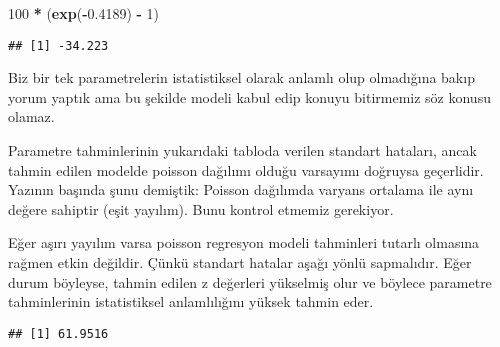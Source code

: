 \documentclass[
]{book}
\newenvironment{Shaded}{\begin{snugshade}}{\end{snugshade}}
\newcommand{\DataTypeTok}[1]{\textcolor[rgb]{0.13,0.29,0.53}{#1}}
\newcommand{\DecValTok}[1]{\textcolor[rgb]{0.00,0.00,0.81}{#1}}
\newcommand{\FloatTok}[1]{\textcolor[rgb]{0.00,0.00,0.81}{#1}}
\newcommand{\KeywordTok}[1]{\textcolor[rgb]{0.13,0.29,0.53}{\textbf{#1}}}
\newcommand{\NormalTok}[1]{#1}
\newcommand{\OperatorTok}[1]{\textcolor[rgb]{0.81,0.36,0.00}{\textbf{#1}}}
\newcommand{\StringTok}[1]{\textcolor[rgb]{0.31,0.60,0.02}{#1}}
\begin{document}
\begin{Shaded}
\begin{Highlighting}[]
\DecValTok{100} \OperatorTok{*}\StringTok{ }\NormalTok{(}\KeywordTok{exp}\NormalTok{(}\OperatorTok{-}\FloatTok{0.4189}\NormalTok{) }\OperatorTok{-}\StringTok{ }\DecValTok{1}\NormalTok{)}
\end{Highlighting}
\end{Shaded}

\begin{verbatim}
## [1] -34.223
\end{verbatim}

Biz bir tek parametrelerin istatistiksel olarak anlamlı olup olmadığına bakıp yorum yaptık ama bu şekilde modeli kabul edip konuyu bitirmemiz söz konusu olamaz.

Parametre tahminlerinin yukarıdaki tabloda verilen standart hataları, ancak tahmin edilen modelde poisson dağılımı olduğu varsayımı doğruysa geçerlidir. Yazının başında şunu demiştik: Poisson dağılımda varyans ortalama ile aynı değere sahiptir (eşit yayılım). Bunu kontrol etmemiz gerekiyor.

Eğer aşırı yayılım varsa poisson regresyon modeli tahminleri tutarlı olmasına rağmen etkin değildir. Çünkü standart hatalar aşağı yönlü sapmalıdır. Eğer durum böyleyse, tahmin edilen z değerleri yükselmiş olur ve böylece parametre tahminlerinin istatistiksel anlamlılığını yüksek tahmin eder.

\begin{Shaded}
\end{Shaded}

\begin{verbatim}
## [1] 61.9516
\end{verbatim}
\end{document}
